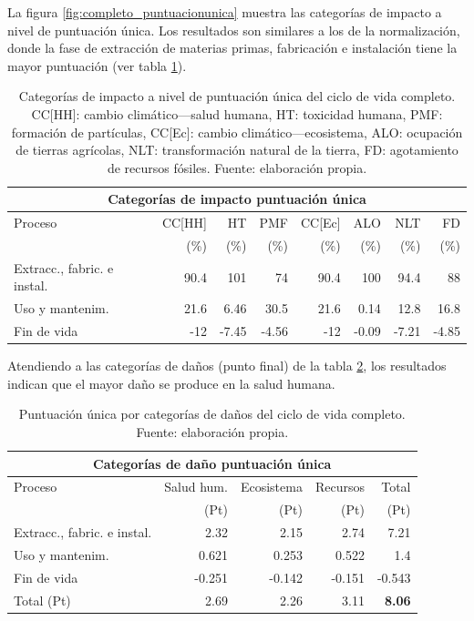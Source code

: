 La figura \ref{fig:completo_puntuacionunica} muestra las categorías de impacto a nivel de puntuación única. Los resultados son similares a los de la normalización, donde la fase de extracción de materias primas, fabricación e instalación tiene la mayor puntuación (ver tabla \ref{categoriasimpactocompletopuntunica}).

\begin{table}[!htb]
\centering
\begin{tabular}{p{4cm}rrrrrrr}
\toprule
\multicolumn{8}{c}{Categorías de impacto puntuación única}\\
\midrule
Proceso & CC[HH] & HT & PMF & CC[Ec] & ALO & NLT & FD\\
 &  (\%) & (\%) & (\%) & (\%) & (\%) & (\%) & (\%)\\
\midrule
Extracc., fabric. e instal. & 90.4 & 101 & 74 & 90.4 & 100 & 94.4 & 88\\
Uso y mantenim. & 21.6 & 6.46 & 30.5 & 21.6 & 0.14 & 12.8 & 16.8\\
Fin de vida & -12 & -7.45 & -4.56 & -12 & -0.09 & -7.21 & -4.85\\
\bottomrule
\end{tabular}
\caption[Categorías de impacto a nivel de puntuación única del ciclo de vida completo.]{Categorías de impacto a nivel de puntuación única del ciclo de vida completo. CC[HH]: cambio climático—salud humana, HT: toxicidad humana, PMF: formación de partículas, CC[Ec]: cambio climático—ecosistema, ALO: ocupación de tierras agrícolas, NLT: transformación natural de la tierra, FD: agotamiento de recursos fósiles. Fuente: elaboración propia.}
\label{categoriasimpactocompletopuntunica}
\end{table}

Atendiendo a las categorías de daños (punto final) de la tabla \ref{categoriasdanoscompleto}, los resultados indican que el mayor daño se produce en la salud humana.

\begin{table}[!htb]
\centering
\begin{tabular}{p{6cm}rrrr}
\toprule
\multicolumn{5}{c}{Categorías de daño puntuación única}\\
\midrule
Proceso & Salud hum. & Ecosistema & Recursos & Total\\
 & (Pt) & (Pt) &  (Pt) & (Pt)\\
\midrule
Extracc., fabric. e instal. & 2.32 & 2.15 & 2.74 & 7.21\\
Uso y mantenim. & 0.621 & 0.253 & 0.522 & 1.4\\
Fin de vida & -0.251 & -0.142 & -0.151 & -0.543\\
\midrule
Total (Pt) & 2.69 & 2.26 & 3.11 & \textbf{8.06}\\
\bottomrule
\end{tabular}
\caption[Puntuación única por categorías de daños del ciclo de vida completo.]{Puntuación única por categorías de daños del ciclo de vida completo. Fuente: elaboración propia.}
\label{categoriasdanoscompleto}
\end{table}


